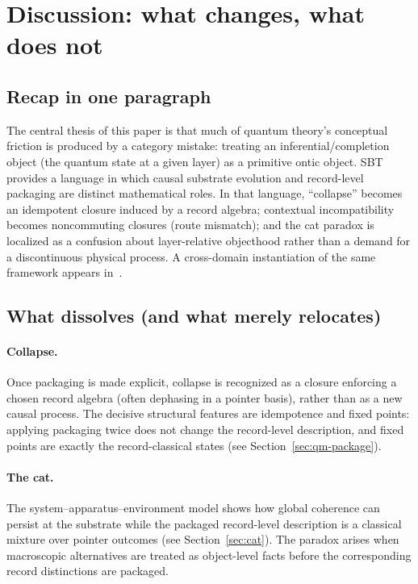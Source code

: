 \section{Discussion: what changes, what does not}\label{sec:discussion}

\subsection{Recap in one paragraph}

The central thesis of this paper is that much of quantum theory's conceptual friction is produced by a category mistake: treating an inferential/completion object (the quantum state at a given layer) as a primitive ontic object.
SBT provides a language in which causal substrate evolution and record-level packaging are distinct mathematical roles.
In that language, ``collapse'' becomes an idempotent closure induced by a record algebra; contextual incompatibility becomes noncommuting closures (route mismatch); and the cat paradox is localized as a confusion about layer-relative objecthood rather than a demand for a discontinuous physical process. A cross-domain instantiation of the same framework appears in~\cite{Tsiokos2026Stone}.

\subsection{What dissolves (and what merely relocates)}

\paragraph{Collapse.}
Once packaging is made explicit, collapse is recognized as a closure enforcing a chosen record algebra (often dephasing in a pointer basis), rather than as a new causal process.
The decisive structural features are idempotence and fixed points: applying packaging twice does not change the record-level description, and fixed points are exactly the record-classical states (see Section~\ref{sec:qm-package}).

\paragraph{The cat.}
The system--apparatus--environment model shows how global coherence can persist at the substrate while the packaged record-level description is a classical mixture over pointer outcomes (see Section~\ref{sec:cat}).
The paradox arises when macroscopic alternatives are treated as object-level facts before the corresponding record distinctions are packaged.

